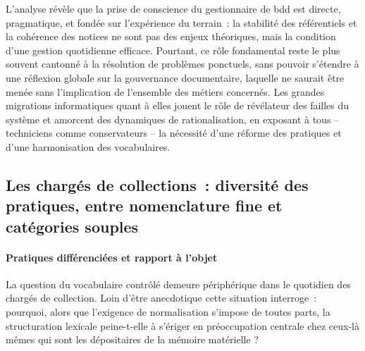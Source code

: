 L’analyse révèle que la prise de conscience du gestionnaire de \gls{bdd} est directe, pragmatique, et fondée sur l’expérience du terrain~: la stabilité des référentiels et la cohérence des notices ne sont pas des enjeux théoriques, mais la condition d’une gestion quotidienne efficace. Pourtant, ce rôle fondamental reste le plus souvent cantonné à la résolution de problèmes ponctuels, sans pouvoir s’étendre à une réflexion globale sur la gouvernance documentaire, laquelle ne saurait être menée sans l’implication de l’ensemble des métiers concernés. Les grandes migrations informatiques quant à elles jouent le rôle de révélateur des failles du système et amorcent des dynamiques de rationalisation, en exposant à tous -- techniciens comme conservateurs -- la nécessité d’une réforme des pratiques et d’une harmonisation des vocabulaires.



\subsection{Les chargés de collections~: diversité des pratiques, entre nomenclature fine et catégories souples}



\paragraph*{Pratiques différenciées et rapport à l’objet}

La question du vocabulaire contrôlé demeure périphérique dans le quotidien des chargés de collection. Loin d’être anecdotique cette situation interroge~: pourquoi, alors que l’exigence de normalisation s’impose de toutes parts, la structuration lexicale peine-t-elle à s’ériger en préoccupation centrale chez ceux-là mêmes qui sont les dépositaires de la mémoire matérielle ?



